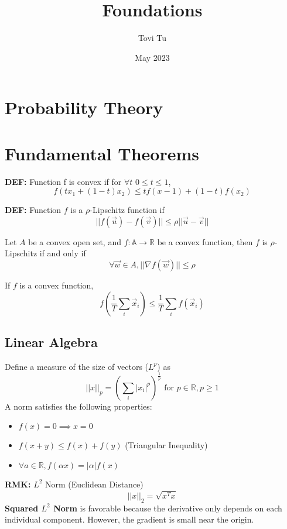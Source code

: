 \documentclass[9pt]{article}
\title{Foundations}
\author{Tovi Tu}
\date{May 2023}
\newcommand{\de}{\textbf{DEF: }}
\newcommand{\rmk}{\textbf{RMK: }}
\newcommand{\x}{\vec{x}}
\newcommand{\R}{\mathbb{R}}
\newenvironment{theorem}[2][Theorem]{\begin{trivlist}
\item[\hskip \labelsep {\bfseries #1}\hskip \labelsep {\bfseries #2}]}{\end{trivlist}}
\begin{document}
\maketitle

\section{Probability Theory}

\newpage
\section{Fundamental Theorems}

\de Function f is convex if for $\forall t$ $0\le t\le1$,
$$
f(tx_1+(1-t)x_2)\le tf(x-1)+(1-t)f(x_2)
$$

\de Function $f$ is a $\rho$-Lipschitz function if 
$$
||f(\vec u)-f(\vec v)||\le\rho||\vec u - \vec v||
$$

\begin{theorem}{:}
Let $A$ be a convex open set, and $f: \mathbb{A}\to\mathbb{R}$ be a convex function, then $f$ is $\rho$-Lipschitz if and only if 
$$
\forall\vec w \in A,||\nabla f(\vec w)||\le \rho
$$
\end{theorem}

\begin{theorem}{Jensen's Inequality}
If $f$ is a convex function, 
$$
f(\frac{1}{T}\sum_{i}\vec x_i) \le \frac{1}{T}\sum_if(\x_i)
$$
\end{theorem}

\subsection{Linear Algebra}

\begin{theorem}{Norms}
Define a measure of the size of vectors ($L^p$) as 
$$
||x||_p = (\sum_i|x_i|^p)^{\frac{1}{p}} \text{ for } p\in \R,p\ge1
$$
A norm satisfies the following properties:
\begin{itemize}
    \item $f(x) = 0 \implies x=0$
    \item $f(x+y) \le f(x) + f(y)$ (Triangular Inequality)
    \item $\forall a\in\R, f(\alpha x) = |\alpha|f(x)$
\end{itemize}
\end{theorem}

\rmk $L^2$ Norm (Euclidean Distance)
$$
||x||_2 = \sqrt{x^Tx}
$$
\textbf{Squared $L^2$ Norm} is favorable because the derivative only depends on each individual component. However, the gradient is small near the origin. 
\end{document}
